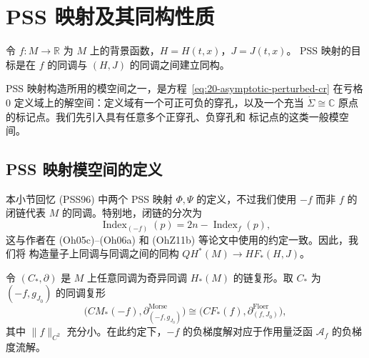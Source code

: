 \section{PSS 映射及其同构性质}
\label{sec:pss-map-isomorphism}

令 $f:M\to\mathbb R$ 为 $M$ 上的背景\personMorse{}函数，$H=H(t,x)$，$J=J(t,x)$。
PSS 映射的目标是在 $f$ 的\personMorse{}同调与 $(H,J)$ 的\personFloer{}同调之间建立同构。

PSS 映射构造所用的模空间之一，是方程~\eqref{eq:20-asymptotic-perturbed-cr} 在亏格
$0$ 定义域上的解空间：定义域有一个可正可负的穿孔，以及一个充当
$\dot\Sigma\cong\mathbb C$ 原点的标记点。我们先引入具有任意多个正穿孔、负穿孔和
标记点的这类一般模空间。

\subsection{PSS 映射模空间的定义}

本小节回忆 (PSS96) 中两个 PSS 映射 $\Phi,\Psi$ 的定义，不过我们使用 $-f$ 而非
$f$ 的\personMorse{}闭链代表 $M$ 的同调。特别地，\personMorse{}闭链的分次为
\[
 \operatorname{Index}_{(-f)}(p)=2n-\operatorname{Index}_f(p),
\]
这与作者在 (Oh05c)--(Oh06a) 和 (OhZ11b) 等论文中使用的约定一致。因此，我们将
构造量子上同调与\personFloer{}同调之间的同构
$QH^*(M)\to HF_*(H,J)$。

令 $(C_*,\partial)$ 是 $M$ 上任意同调为奇异同调 $H_*(M)$ 的链复形。取
$C_*$ 为 $(-f,g_{J_0})$ 的\personMorse{}同调复形
\[
 \bigl(CM_*(-f),\partial^{\mathrm{Morse}}_{(-f,g_{J_0})}\bigr)
 \cong\bigl(CF_*(f),\partial^{\mathrm{Floer}}_{(f,J_0)}\bigr),
\]
其中 $\|f\|_{C^2}$ 充分小。在此约定下，$-f$ 的负梯度解对应于作用量泛函
$\mathcal A_f$ 的负梯度流解。

